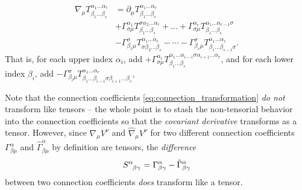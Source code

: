 \begin{equation}
\begin{split}
	\nabla_\mu T^{\alpha_1 \ldots \alpha_r}_{\beta_1 \ldots \beta_s} &= \partial_\mu T^{\alpha_1 \ldots \alpha_r}_{\beta_1 \ldots \beta_s} \\
	                                                                 &+ \Gamma^{\alpha_1}_{\sigma\mu} T^{\sigma \alpha_2 \ldots \alpha_r}_{\beta_1 \ldots \beta_s} + \dots + \Gamma^{\alpha_r}_{\sigma\mu} T^{\alpha_1 \ldots \alpha_{r-1}\sigma}_{\beta_1 \ldots \beta_s} \\
	                                                                 &- \Gamma^\sigma_{\beta_1 \mu} T^{\alpha_1 \ldots \alpha_r}_{\sigma \beta_2 \ldots \beta_s} - \cdots - \Gamma^\sigma_{\beta_s \mu} T^{\alpha_1 \ldots \alpha_r}_{\beta_1 \ldots \beta_{s-1} \sigma} .
	\label{eq:def_cov_deriv}
\end{split}
\end{equation}
That is, for each upper index $\alpha_i$, add $+\Gamma^{\alpha_i}_{\sigma \mu} T^{\alpha_1 \ldots \alpha_{i-1} \sigma \alpha_{i+1} \ldots \alpha_r}_{\beta_1 \ldots \beta_s}$,
and for each lower index $\beta_i$, add $-\Gamma^{\sigma}_{\beta_i \mu} T^{\alpha_1 \ldots \alpha_r}_{\beta_1 \ldots \beta_{i-1} \sigma \beta_{i+1} \ldots \beta_s}$,

Note that the connection coefficients \eqref{eq:connection_transformation} \emph{do not} transform like tensors -- the whole point is to stash the non-tensorial behavior into the connection coefficients so that the \emph{covariant derivative} transforms as a tensor.
However, since $\nabla_\mu V^\nu$ and $\hat{\nabla}_\mu V^\nu$ for two different connection coefficients $\Gamma^\alpha_{\beta \mu}$ and $\hat{\Gamma}^\alpha_{\beta \mu}$ by definition are tensors, the \emph{difference}
\begin{equation}
	S\indices{^\alpha_\beta_\gamma} = \Gamma^\alpha_{\beta \gamma} - \hat{\Gamma}^\alpha_{\beta \gamma}
\end{equation}
between two connection coefficients \emph{does} transform like a tensor.

